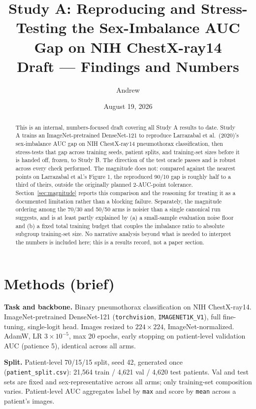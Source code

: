 \documentclass[11pt]{article}
\title{Study A: Reproducing and Stress-Testing the Sex-Imbalance AUC Gap on NIH ChestX-ray14 \\ \large Draft --- Findings and Numbers}
\author{Andrew}
\date{August 19, 2026}
\begin{document}
\maketitle

\begin{abstract}
\noindent This is an internal, numbers-focused draft covering all Study A results to date. Study A trains an ImageNet-pretrained DenseNet-121 to reproduce Larrazabal et al.\ (2020)'s sex-imbalance AUC gap on NIH ChestX-ray14 pneumothorax classification, then stress-tests that gap across training seeds, patient splits, and training-set sizes before it is handed off, frozen, to Study B. The direction of the test oracle passes and is robust across every check performed. The magnitude does not: compared against the nearest points on Larrazabal et al.'s Figure 1, the reproduced 90/10 gap is roughly half to a third of theirs, outside the originally planned 2-AUC-point tolerance. Section~\ref{sec:magnitude} reports this comparison and the reasoning for treating it as a documented limitation rather than a blocking failure. Separately, the magnitude ordering among the 70/30 and 50/50 arms is noisier than a single canonical run suggests, and is at least partly explained by (a) a small-sample evaluation noise floor and (b) a fixed total training budget that couples the imbalance ratio to absolute subgroup training-set size. No narrative analysis beyond what is needed to interpret the numbers is included here; this is a results record, not a paper section.
\end{abstract}

\section{Methods (brief)}

\textbf{Task and backbone.} Binary pneumothorax classification on NIH ChestX-ray14. ImageNet-pretrained DenseNet-121 (\texttt{torchvision}, \texttt{IMAGENET1K\_V1}), full fine-tuning, single-logit head. Images resized to $224\times224$, ImageNet-normalized. AdamW, LR $3\times10^{-5}$, max 20 epochs, early stopping on patient-level validation AUC (patience 5), identical across all arms.

\textbf{Split.} Patient-level 70/15/15 split, seed 42, generated once (\texttt{patient\_split.csv}): 21{,}564 train / 4{,}621 val / 4{,}620 test patients. Val and test sets are fixed and sex-representative across all arms; only training-set composition varies. Patient-level AUC aggregates label by \texttt{max} and score by \texttt{mean} across a patient's images.
\end{document}
